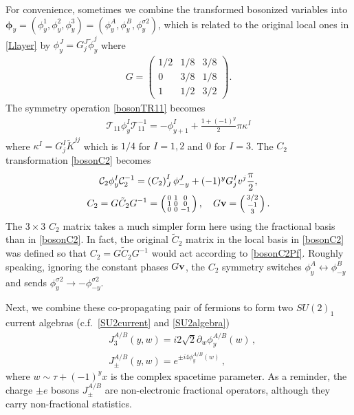 For convenience, sometimes we combine the transformed bosonized variables into $\boldsymbol\phi_y=(\phi^1_y,\phi^2_y,\phi^3_y)=(\phi^A_y,\phi^B_y,\phi^{\sigma2}_y)$, which is related to the original local ones in \eqref{Llayer} by $\phi^J_y=G^J_j\tilde\phi^j_y$ where \begin{align}G=\begin{pmatrix}1/2&1/8&3/8\\0&3/8&1/8\\1&1/2&3/2\end{pmatrix}.\end{align} The \AFTR symmetry operation \eqref{bosonTR11} becomes \begin{align}\mathcal{T}_{11}\phi^I_y\mathcal{T}_{11}^{-1}=-\phi^I_{y+1}+\frac{1+(-1)^y}{2}\pi\kappa^I\label{bosonTR11Pf}
\end{align} where $\kappa^I=G^I_j\tilde{K}^{jj}$ which is $1/4$ for $I=1,2$ and $0$ for $I=3$. The $C_2$ transformation \eqref{bosonC2} becomes \begin{gather}\mathcal{C}_2\phi^I_y\mathcal{C}_2^{-1}=\left(C_2\right)^I_J\phi^J_{-y}+(-1)^yG^I_jv^j\frac{\pi}{2},\label{bosonC2Pf}\\C_2=G\tilde{C}_2G^{-1}=\left(\begin{smallmatrix}0&1&0\\1&0&0\\0&0&-1\end{smallmatrix}\right),\quad G{\bf v}=\left(\begin{smallmatrix}3/2\\-1\\3\end{smallmatrix}\right).\nonumber\end{gather} The $3\times3$ $C_2$ matrix takes a much simpler form here using the fractional basis than in \eqref{bosonC2}. In fact, the original $\tilde{C}_2$ matrix in the local basis in \eqref{bosonC2} was defined so that $C_2=G\tilde{C}_2G^{-1}$ would act according to \eqref{bosonC2Pf}. Roughly speaking, ignoring the constant phases $G{\bf v}$, the $C_2$ symmetry switches $\phi^A_y\leftrightarrow\phi^B_{-y}$ and sends $\phi^{\sigma2}_y\to-\phi^{\sigma2}_{-y}$.

Next, we combine these co-propagating pair of fermions to form two $SU(2)_1$ current algebras (c.f.~\eqref{SU2current} and \eqref{SU2algebra}) \begin{align}&J_3^{A/B}(y,w)=i2\sqrt{2}\partial_w\phi^{A/B}_y(w)\nonumber \,, \\&J_\pm^{A/B}(y,w)=e^{\pm i4\phi^{A/B}_y(w)} \,, %
\end{align} where $w\sim\tau+(-1)^yx$ is the complex spacetime parameter. As a reminder, the charge $\pm e$ bosons $J^{A/B}_\pm$ are non-electronic fractional operators, although they carry non-fractional statistics.

